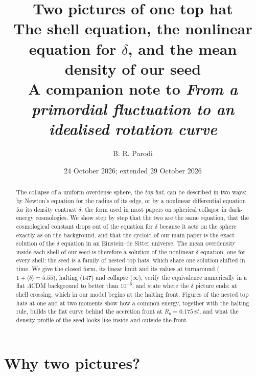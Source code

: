 \documentclass[11pt,a4paper]{article}
\title{Two pictures of one top hat\\[4pt]
\large The shell equation, the nonlinear equation for $\delta$, and the mean
density of our seed\\[2pt]
\normalsize A companion note to \emph{From a primordial fluctuation to an idealised rotation curve}}
\author{B. R. Parodi}
\date{24 October 2026; extended 29 October 2026}
\newcommand{\md}{\langle\delta\rangle}
\begin{document}
\maketitle

\begin{abstract}
The collapse of a uniform overdense sphere, the \emph{top hat}, can be
described in two ways: by Newton's equation for the radius of its edge,
or by a nonlinear differential equation for its density contrast
$\delta$, the form used in most papers on spherical collapse in
dark-energy cosmologies. We show step by step that the two are the same
equation, that the cosmological constant drops out of the equation for
$\delta$ because it acts on the sphere exactly as on the background, and
that the cycloid of our main paper is the exact solution of the
$\delta$ equation in an Einstein--de Sitter universe. The mean
overdensity inside each shell of our seed is therefore a solution of the
nonlinear $\delta$ equation, one for every shell: the seed is a family
of nested top hats, which share one solution shifted in time. We give
the closed form, its linear limit and its values at turnaround
($1+\md=5.55$), halting (147) and collapse ($\infty$), verify the
equivalence numerically in a flat $\Lambda$CDM background to better than
$10^{-6}$, and state where the $\delta$ picture ends: at shell crossing,
which in our model begins at the halting front. Figures of the nested top
hats at one and at two moments show how a common energy, together with the
halting rule, builds the flat curve behind the accretion front at
$R_b=0.175\,vt$, and what the density profile of the seed looks like inside
and outside the front.
\end{abstract}

\section{Why two pictures?}
\end{document}
